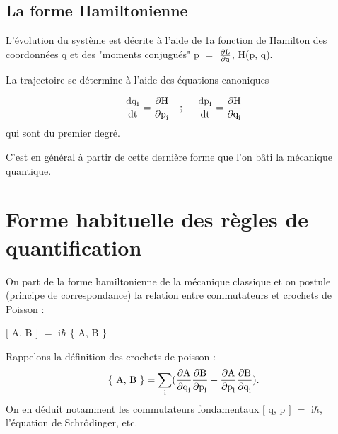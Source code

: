 \begin{center}  \end{center}

\subsection{La forme Hamiltonienne}
L'évolution du système est décrite à l'aide
de 1a fonction de Hamilton des coordonnées q et des "moments conjugués"
p $=$ $\frac{\partial \text{L}}{\partial \dot{\text{q}}}$, H(p, q).

La trajectoire se détermine à l'aide des équations canoniques

\[
\frac{\mt{dq}_\mt{i}}{\mt{dt}} = \frac{\partial \mt{H}}{\partial \mt{p}_\mt{i}}
\ \ \ ;\ \ \ \ 
\frac{\mt{dp}_\mt{i}}{\mt{dt}} = \frac{\partial \mt{H}}{\partial \mt{q}_\mt{i}}
\]
qui sont du premier degré.

C'est en général à partir de cette dernière forme que l'on bâti
la mécanique quantique.
\section{Forme habituelle des règles de quantification}

On part de la forme hamiltonienne de la mécanique classique
et on postule (principe de correspondance) la relation entre commutateurs
et crochets de Poisson :

\begin{center}
$[$ A, B $]$ $=$ i$\hbar$ \{ A, B \}
\end{center}

Rappelons la définition des crochets de poisson :
\[
\{\text{ A, B }\} = \sum_{\text{i}}
(\frac{\partial \text{A}}{\partial \text{q}_{\text{i}}}\frac{\partial \text{B}}{\partial \text{p}_{\text{i}}}
- \frac{\partial \text{A}}{\partial \text{p}_{\text{i}}}\frac{\partial \text{B}}{\partial \text{q}_{\text{i}}}).
\]
On en déduit notamment les commutateurs fondamentaux $[$ q, p $]$ $=$ i$\hbar$,
l'équation de Schrôdinger, etc.

